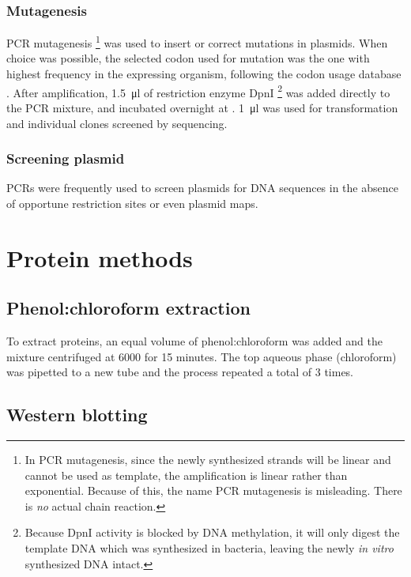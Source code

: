      \subsubsection{Mutagenesis}
        PCR mutagenesis
        \footnote{
          In PCR mutagenesis, since the newly synthesized strands will
          be linear and cannot be used as template, the amplification
          is linear rather than exponential. Because of this, the name
          PCR mutagenesis is misleading. There is \emph{no} actual chain reaction.
        }
        was used to insert or correct mutations in plasmids. When choice
        was possible, the selected codon used for mutation was the one
        with highest frequency in the expressing organism, following the
        codon usage database \citep{codon_usage}. After amplification,
        \SI{1.5}{\ul} of restriction enzyme DpnI
        \footnote{
          Because DpnI activity is blocked by DNA methylation, it will
          only digest the template DNA which was synthesized in bacteria,
          leaving the newly \textit{in vitro} synthesized DNA intact.
        }
        was added directly to the PCR mixture, and incubated overnight at
        . \SI{1}{\ul} was used for transformation and individual
        clones screened by sequencing.

      \subsubsection{Screening plasmid}
        PCRs were frequently used to screen plasmids for DNA sequences
        in the absence of opportune restriction sites or even plasmid maps.

  \section{Protein methods}
    \subsection{Phenol:chloroform extraction}
      \label{sec:phenol-extraction}
      To extract proteins, an equal volume of phenol:chloroform was
      added and the mixture centrifuged at \SI{6000}{\gn} for 15 minutes.
      The top aqueous phase (chloroform) was pipetted to a new tube and
      the process repeated a total of 3 times.

    \subsection{Western blotting}
